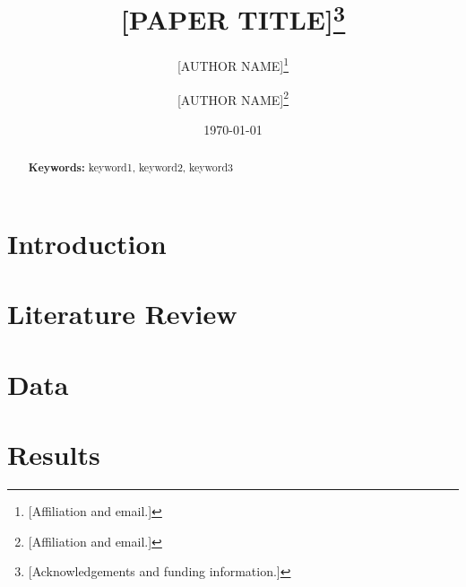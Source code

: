\documentclass[12pt,a4paper]{article}
\begin{document}
\begin{titlepage}

    \title{[PAPER TITLE]\thanks{[Acknowledgements and funding information.]}}

    \author{[AUTHOR NAME]\thanks{[Affiliation and email.]} \and [AUTHOR NAME]\thanks{[Affiliation and email.]}}

    \date{\today}

    \maketitle

    \begin{abstract}

        \bigskip
        \noindent\textbf{Keywords:} keyword1, keyword2, keyword3

    \end{abstract}

    \setcounter{page}{0}
    \thispagestyle{empty}

\end{titlepage}

\clearpage

\doublespacing


\section{Introduction}


\section{Literature Review}


% 

% 

\section{Data}


\section{Results}

\end{document}
